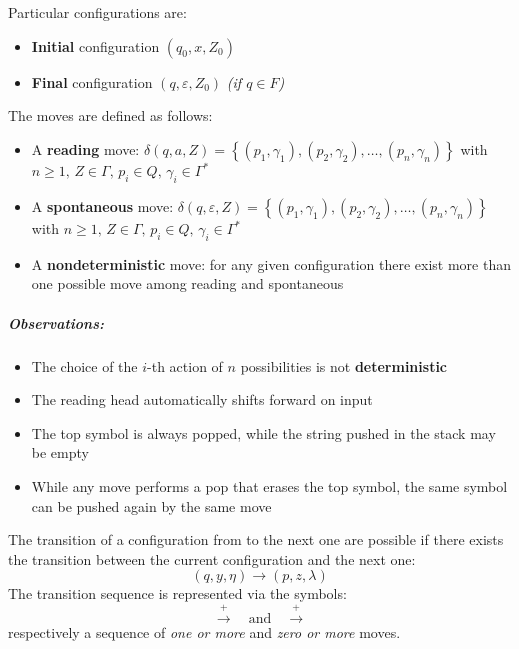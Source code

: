 \documentclass[english]{article}
\begin{document}
Particular configurations are:

\begin{itemize}
  \item \textbf{Initial} configuration \(\left( q_0, x, Z_0 \right)\)
  \item \textbf{Final} configuration \(\left( q, \varepsilon, Z_0 \right)\) \textit{(if \(q \in F\))}
\end{itemize}

\begin{definition}
  The moves are defined as follows:
  \begin{itemize}
    \item A \textbf{reading} move: \(\delta(q, a, Z) = \left\{ (p_1, \gamma_1), (p_2, \gamma_2), \ldots, (p_n, \gamma_n) \right\}\) with \(n \geq 1, \, Z \in \Gamma, \, p_i \in Q, \, \gamma_i \in \Gamma^\ast\)
    \item A \textbf{spontaneous} move: \(\delta(q, \varepsilon, Z) = \left\{ (p_1, \gamma_1), (p_2, \gamma_2), \ldots, (p_n, \gamma_n) \right\}\) with \(n \geq 1, \, Z \in \Gamma, \, p_i \in Q, \, \gamma_i \in \Gamma^\ast\)
    \item A \textbf{nondeterministic} move: for any given configuration there exist more than one possible move among reading and spontaneous
  \end{itemize}
\end{definition}

\subparagraph*{Observations:}

\begin{itemize}
  \item The choice of the \(i\)-th action of \(n\) possibilities is not \textbf{deterministic}
  \item The reading head automatically shifts forward on input
  \item The top symbol is always popped, while the string pushed in the stack may be empty
  \item While any move performs a pop that erases the top symbol, the same symbol can be pushed again by the same move
\end{itemize}

\bigskip
The transition of a configuration from to the next one are possible if there exists the transition between the current configuration and the next one:
\[ \left( q, y, \eta \right) \rightarrow \left( p, z, \lambda \right) \]
The transition sequence is represented via the symbols:
\[ \xrightarrow{+} \quad \text{and} \quad \xrightarrow{+} \]
respectively a sequence of \textit{one or more} and \textit{zero or more} moves.
\end{document}
